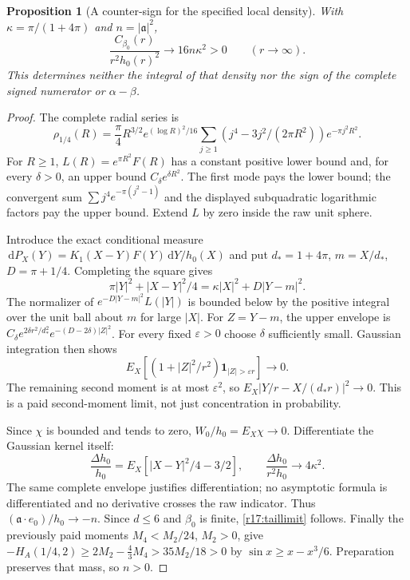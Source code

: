 \documentclass[11pt]{article}
\numberwithin{equation}{section}
\newtheorem{proposition}[theorem]{Proposition}
\newcommand{\dd}{\,\mathrm d}
\begin{document}
\begin{proposition}[A counter-sign for the specified local density]
\label{r17:tailsign}
With $\kappa=\pi/(1+4\pi)$ and $n=|\mathfrak a|^2$,
\begin{equation}\label{r17:taillimit}
 \frac{C_{\beta_0}(r)}{r^2h_0(r)^2}\longrightarrow16n\kappa^2>0
 \qquad(r\longrightarrow\infty).
\end{equation}
This determines neither the integral of that density nor the sign
of the complete signed numerator or $\alpha-\beta$.
\end{proposition}
\begin{proof}
The complete radial series is
\[
 \rho_{1/4}(R)=\frac\pi4R^{3/2}e^{(\log R)^2/16}
 \sum_{j\ge1}(j^4-3j^2/(2\pi R^2))e^{-\pi j^2R^2}.
\]
For $R\ge1$, $L(R)=e^{\pi R^2}F(R)$ has a constant positive lower
bound and, for every $\delta>0$, an upper bound
$C_\delta e^{\delta R^2}$. The first mode pays the lower bound;
the convergent sum $\sum j^4e^{-\pi(j^2-1)}$ and the displayed
subquadratic logarithmic factors pay the upper bound. Extend $L$
by zero inside the raw unit sphere.

Introduce the exact conditional measure
$\dd P_X(Y)=K_1(X-Y)F(Y)\dd Y/h_0(X)$ and put
$d_*=1+4\pi$, $m=X/d_*$, $D=\pi+1/4$. Completing the square gives
\[
 \pi|Y|^2+|X-Y|^2/4=\kappa|X|^2+D|Y-m|^2.
\]
The normalizer of $e^{-D|Y-m|^2}L(|Y|)$ is bounded below by the
positive integral over the unit ball about $m$ for large $|X|$.
For $Z=Y-m$, the upper envelope is
$C_\delta e^{2\delta r^2/d_*^2}e^{-(D-2\delta)|Z|^2}$.
For every fixed $\varepsilon>0$ choose $\delta$ sufficiently small.
Gaussian integration then shows
\[
 E_X[(1+|Z|^2/r^2)\mathbf1_{|Z|>\varepsilon r}]\longrightarrow0.
\]
The remaining second moment is at most $\varepsilon^2$, so
$E_X|Y/r-X/(d_*r)|^2\to0$. This is a paid second-moment limit,
not just concentration in probability.

Since $\chi$ is bounded and tends to zero,
$W_0/h_0=E_X\chi\to0$. Differentiate the Gaussian kernel itself:
\[
 \frac{\Delta h_0}{h_0}=E_X[|X-Y|^2/4-3/2],\qquad
 \frac{\Delta h_0}{r^2h_0}\longrightarrow4\kappa^2.
\]
The same complete envelope justifies differentiation; no asymptotic
formula is differentiated and no derivative crosses the raw indicator.
Thus $(\mathfrak a\cdot e_0)/h_0\to-n$. Since $d\le6$ and
$\beta_0$ is finite, \eqref{r17:taillimit} follows.
Finally the previously paid moments $M_4<M_2/24$, $M_2>0$, give
$-H_A(1/4,2)\ge2M_2-\tfrac43M_4>35M_2/18>0$ by
$\sin x\ge x-x^3/6$. Preparation preserves that mass, so $n>0$.
\end{proof}
\end{document}
